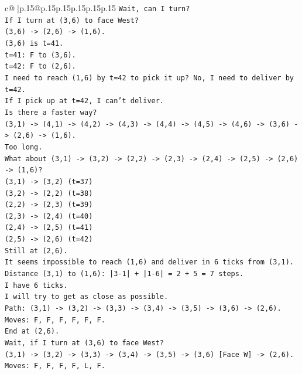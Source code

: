 \documentclass{article}
\begin{document}
{\begin{supertabular}{c@{$\;$}|p{.15\linewidth}@{}p{.15\linewidth}p{.15\linewidth}p{.15\linewidth}p{.15\linewidth}p{.15\linewidth}}
{{{\texttt{Wait, can I turn?} \\
\texttt{If I turn at (3,6) to face West?} \\
\texttt{(3,6) {-}> (2,6) {-}> (1,6).} \\
\texttt{(3,6) is t=41.} \\
\texttt{t=41: F to (3,6).} \\
\texttt{t=42: F to (2,6).} \\
\texttt{I need to reach (1,6) by t=42 to pick it up? No, I need to deliver by t=42.} \\
\texttt{If I pick up at t=42, I can't deliver.} \\
\texttt{Is there a faster way?} \\
\texttt{(3,1) {-}> (4,1) {-}> (4,2) {-}> (4,3) {-}> (4,4) {-}> (4,5) {-}> (4,6) {-}> (3,6) {-}> (2,6) {-}> (1,6).} \\
\texttt{Too long.} \\
\texttt{What about (3,1) {-}> (3,2) {-}> (2,2) {-}> (2,3) {-}> (2,4) {-}> (2,5) {-}> (2,6) {-}> (1,6)?} \\
\texttt{(3,1) {-}> (3,2) (t=37)} \\
\texttt{(3,2) {-}> (2,2) (t=38)} \\
\texttt{(2,2) {-}> (2,3) (t=39)} \\
\texttt{(2,3) {-}> (2,4) (t=40)} \\
\texttt{(2,4) {-}> (2,5) (t=41)} \\
\texttt{(2,5) {-}> (2,6) (t=42)} \\
\texttt{Still at (2,6).} \\
\texttt{It seems impossible to reach (1,6) and deliver in 6 ticks from (3,1).} \\
\texttt{Distance (3,1) to (1,6): |3{-}1| + |1{-}6| = 2 + 5 = 7 steps.} \\
\texttt{I have 6 ticks.} \\
\texttt{I will try to get as close as possible.} \\
\texttt{Path: (3,1) {-}> (3,2) {-}> (3,3) {-}> (3,4) {-}> (3,5) {-}> (3,6) {-}> (2,6).} \\
\texttt{Moves: F, F, F, F, F, F.} \\
\texttt{End at (2,6).} \\
\texttt{Wait, if I turn at (3,6) to face West?} \\
\texttt{(3,1) {-}> (3,2) {-}> (3,3) {-}> (3,4) {-}> (3,5) {-}> (3,6) {[}Face W{]} {-}> (2,6).} \\
\texttt{Moves: F, F, F, F, L, F.} \\
}}}
\end{supertabular}}
\end{document}
